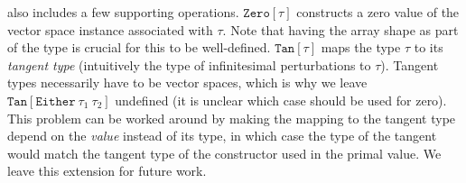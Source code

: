\documentclass[acmsmall,screen,nonacm]{acmart}
\newcommand{\ttt}[1]{\texttt{#1}}
\newcommand{\zeroat}[1]{\ttt{Zero}[#1]}
\newcommand{\tangentof}[1]{\ttt{Tan}[#1]}
\begin{document}
 also includes a few supporting operations.
$\zeroat \tau$ constructs a zero value of the vector space instance associated with $\tau$.
Note that having the array shape as part of the type is crucial for this to be well-defined.
$\tangentof \tau$ maps the type $\tau$ to its \emph{tangent type} (intuitively the type of infinitesimal perturbations to $\tau$).
Tangent types necessarily have to be vector spaces, which is why we leave $\tangentof{\ttt{Either}~\tau_1~\tau_2}$ undefined (it is unclear which case should be used for zero).
This problem can be worked around by making the mapping to the tangent type depend on the \emph{value} instead of its type, in which case the type of the tangent would match the tangent type of the constructor used in the primal value.
We leave this extension for future work.
\end{document}

